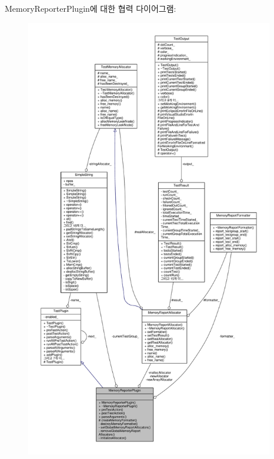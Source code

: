Memory\+Reporter\+Plugin에 대한 협력 다이어그램\+:
\nopagebreak
\begin{figure}[H]
\begin{center}
\leavevmode
\includegraphics[height=550pt]{class_memory_reporter_plugin__coll__graph}
\end{center}
\end{figure}
